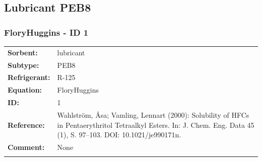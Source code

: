 \subsection{Lubricant PEB8}
%
\subsubsection{FloryHuggins - ID 1}
%
\begin{tabular}[l]{|lp{11.5cm}|}
\hline
\addlinespace

\textbf{Sorbent:} & lubricant \\
\textbf{Subtype:} & PEB8 \\
\textbf{Refrigerant:} & R-125 \\
\textbf{Equation:} & FloryHuggins \\
\textbf{ID:} & 1 \\
\textbf{Reference:} & Wahlström, Åsa; Vamling, Lennart (2000): Solubility of HFCs in Pentaerythritol Tetraalkyl Esters. In: J. Chem. Eng. Data 45 (1), S. 97–103. DOI: 10.1021/je990171n. \\
\textbf{Comment:} & None \\

\addlinespace
\hline
\end{tabular}
\newline


